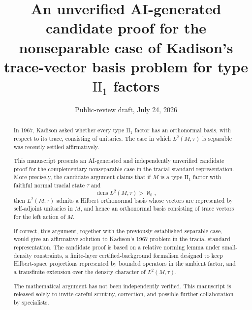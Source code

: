 \documentclass[11pt,letterpaper,reqno]{amsart}
\theoremstyle{definition}
\numberwithin{equation}{section}
\DeclareMathOperator{\dens}{dens}
\begin{document}
\title[Unverified candidate proof for the nonseparable case] {An unverified AI-generated candidate proof for the nonseparable case of Kadison's trace-vector basis problem for type $\mathrm{II}_1$ factors}

\author{} 
\date{Public-review draft, July 24, 2026}


\begin{abstract}
In 1967, Kadison asked whether every type $\mathrm{II}_1$ factor has an
orthonormal basis, with respect to its trace, consisting of unitaries.
The case in which $L^2(M,\tau)$ is separable was recently settled
affirmatively.

This manuscript presents an AI-generated and independently unverified
candidate proof for the complementary nonseparable case in the tracial
standard representation.  More precisely, the candidate argument claims
that if $M$ is a type $\mathrm{II}_1$ factor with faithful normal tracial
state $\tau$ and
\[
   \dens L^2(M,\tau)>\aleph_0,
\]
then $L^2(M,\tau)$ admits a Hilbert orthonormal basis whose vectors are
represented by self-adjoint unitaries in $M$, and hence an orthonormal basis
consisting of trace vectors for the left action of $M$.

If correct, this argument, together with the previously established
separable case, would give an affirmative solution to Kadison's 1967 problem
in the tracial standard representation.  The candidate proof is based on a
relative norming lemma under small-density constraints, a finite-layer
certified-background formalism designed to keep Hilbert-space projections
represented by bounded operators in the ambient factor, and a transfinite
extension over the density character of $L^2(M,\tau)$.

The mathematical argument has not been independently verified.  This
manuscript is released solely to invite careful scrutiny, correction, and
possible further collaboration by specialists.
\end{abstract}





\maketitle
\end{document}
